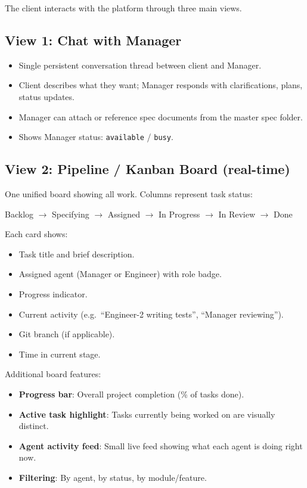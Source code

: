 \documentclass[11pt,a4paper]{article}
\begin{document}
The client interacts with the platform through three main views.

\subsection{View 1: Chat with Manager}

\begin{itemize}
  \item Single persistent conversation thread between client and Manager.
  \item Client describes what they want; Manager responds with clarifications, plans, status updates.
  \item Manager can attach or reference spec documents from the master spec folder.
  \item Shows Manager status: \texttt{available} / \texttt{busy}.
\end{itemize}

\subsection{View 2: Pipeline / Kanban Board (real-time)}

One unified board showing all work. Columns represent task status:

\begin{center}
  Backlog $\to$ Specifying $\to$ Assigned $\to$ In Progress $\to$ In Review $\to$ Done
\end{center}

\noindent Each card shows:
\begin{itemize}
  \item Task title and brief description.
  \item Assigned agent (Manager or Engineer) with role badge.
  \item Progress indicator.
  \item Current activity (e.g.\ ``Engineer-2 writing tests'', ``Manager reviewing'').
  \item Git branch (if applicable).
  \item Time in current stage.
\end{itemize}

\noindent Additional board features:
\begin{itemize}
  \item \textbf{Progress bar}: Overall project completion (\% of tasks done).
  \item \textbf{Active task highlight}: Tasks currently being worked on are visually distinct.
  \item \textbf{Agent activity feed}: Small live feed showing what each agent is doing right now.
  \item \textbf{Filtering}: By agent, by status, by module/feature.
\end{itemize}
\end{document}

